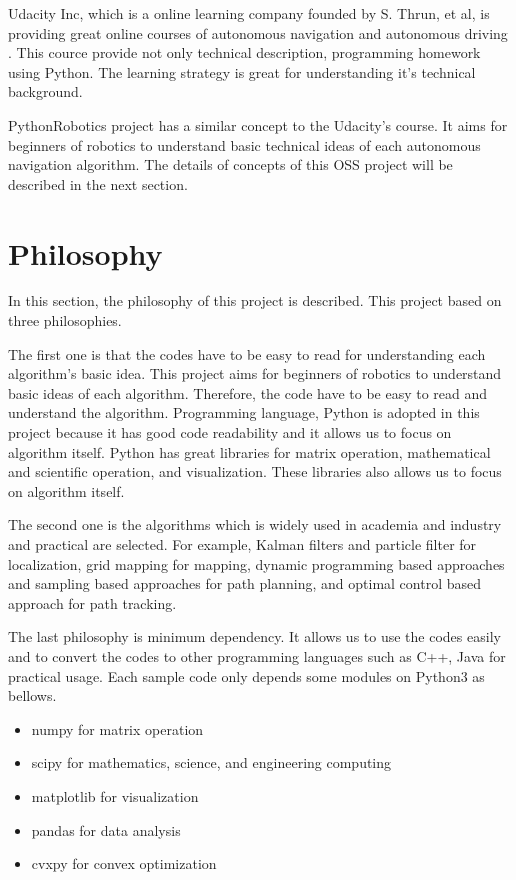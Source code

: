 \documentclass{bmvc2k}
\begin{document}
Udacity Inc, which is a online learning company founded by S. Thrun, et al, is providing great online courses of autonomous navigation and autonomous driving \cite{udacity}.
This cource provide not only technical description, programming homework using Python.
The learning strategy is great for understanding it's technical background.

PythonRobotics project has a similar concept to the Udacity's course.
It aims for beginners of robotics to understand basic technical ideas of each autonomous navigation algorithm.
The details of concepts of this OSS project will be described in the next section. 

\section{Philosophy}
In this section, the philosophy of this project is described.
This project based on three philosophies.

The first one is that the codes have to be easy to read for understanding each algorithm's basic idea.
This project aims for beginners of robotics to understand basic ideas of each algorithm. 
Therefore, the code have to be easy to read and understand the algorithm.
Programming language, Python\cite{python} is adopted in this project because it has good code readability and it allows us to focus on algorithm itself.
Python has great libraries for matrix operation, mathematical and scientific operation, and visualization.
These libraries also allows us to focus on algorithm itself.

The second one is the algorithms which is widely used in academia and industry and practical are selected.
For example, Kalman filters and particle filter for localization, grid mapping for mapping, dynamic programming based approaches and sampling based approaches for path planning, and optimal control based approach for path tracking.

The last philosophy is minimum dependency.
It allows us to use the codes easily and to convert the codes to other programming languages such as C++, Java for practical usage.
Each sample code only depends some modules on Python3 as bellows.

\begin{itemize}
 \item numpy\cite{numpy} for matrix operation
 \item scipy\cite{scipy} for mathematics, science, and engineering computing
 \item matplotlib\cite{matplotlib} for visualization
 \item pandas\cite{pandas} for data analysis
 \item cvxpy\cite{cvxpy} for convex optimization
\end{itemize}
\end{document}
